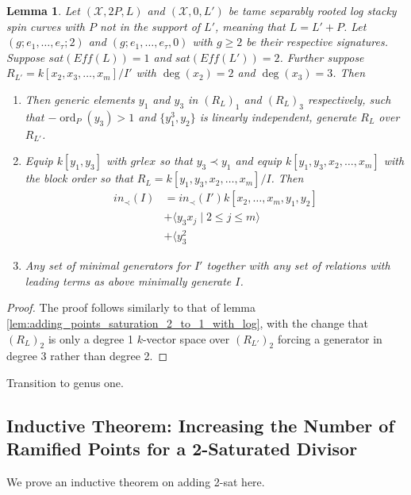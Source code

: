 \documentclass{amsart}
\theoremstyle{plain}
\newtheorem{lem}[thm]{Lemma}
\theoremstyle{definition}
\theoremstyle{remark}
\numberwithin{equation}{section}
\newcommand\ssec{\subsection}
\newcommand \sx{\mathscr X}
\DeclareMathOperator{\ord}{ord}
\newcommand \halfcan{L}
\begin{document}
\begin{lem}
\label{lem:adding_points_saturation_2_to_1_no_log}
Let $(\sx, 2P, \halfcan)$ and $(\sx, 0, L')$ be tame separably rooted log stacky spin curves 
with $P$ not in the support of $\halfcan'$, meaning that $L=L'+P$.  Let $(g; e_1, \ldots, e_
\tau; 2)$ and $(g; e_1, \ldots, e_\tau, 0)$ with $g\ge 2$ be their respective signatures.  
Suppose $sat(Eff(\halfcan))=1$ and $sat(Eff(\halfcan'))=2$.  Further suppose 
$R_{\halfcan'} = k[x_2, x_3, \ldots, x_m]/I'$ with $\deg(x_2) = 2$ and $\deg(x_3) = 3$.  
Then
\begin{enumerate}
\item[(a)] Then generic elements $y_1$ and $y_3$ in $(R_{\halfcan})_1$ and $
(R_{\halfcan})_3$ respectively, such that $-\ord_P(y_3)>1$ and $\{y_1^3, y_2\}$ is linearly 
independent, generate $R_\halfcan$ over $R_{\halfcan'}$.
\item[(b)] Equip $k[y_1,y_3]$ with $grlex$ so that $y_3 \prec y_1$ and equip $k[y_1, y_3, 
x_2, \ldots, x_m]$ with the block order so that $R_\halfcan=k[y_1, y_3, x_2, \ldots, x_m]/I$.  
Then
\begin{align*}
			in_\prec(I) &= in_\prec(I')k[x_2, \ldots, x_m, y_1, y_2] \\
			&+\langle y_3 x_j \mid 2 \leq j \leq m \rangle \\
			&+\langle y_3^2
		\end{align*}
\item[(c)] Any set of minimal generators for $I'$ together with any set of relations with 
leading terms as above minimally generate $I$.
\end{enumerate}
\end{lem}
\begin{proof}
The proof follows similarly to that of lemma 
\ref{lem:adding_points_saturation_2_to_1_with_log}, with the change that $(R_
\halfcan)_2$ is only a degree 1 $k$-vector space over $(R_{\halfcan'})_2$ forcing a 
generator in degree 3 rather than degree 2.  
\end{proof}

Transition to genus one.

\ssec{Inductive Theorem: Increasing the Number of Ramified Points for a 2-Saturated Divisor}
We prove an inductive theorem on adding 2-sat here.
\end{document}
